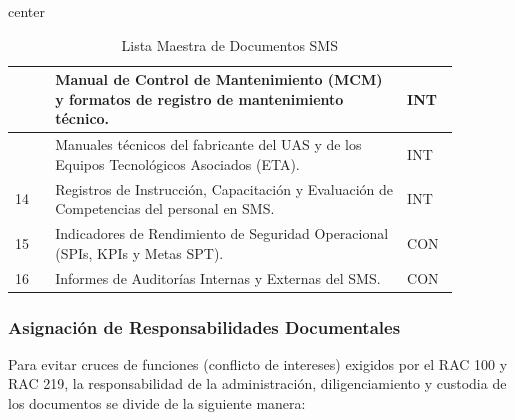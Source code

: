 \begin{table}[H]
\begin{adjustbox}{center}
\begin{tabular}{|>{\centering\arraybackslash}m{0.08\linewidth}|m{0.70\linewidth}|>{\centering\arraybackslash}m{0.1\linewidth}|}
12 & Manual de Control de Mantenimiento (MCM) y formatos de registro de mantenimiento técnico. & INT \\
\hline

13 & Manuales técnicos del fabricante del UAS y de los Equipos Tecnológicos Asociados (ETA). & INT \\
\hline

14 & Registros de Instrucción, Capacitación y Evaluación de Competencias del personal en SMS. & INT \\
\hline

15 & Indicadores de Rendimiento de Seguridad Operacional (SPIs, KPIs y Metas SPT). & CON \\
\hline

16 & Informes de Auditorías Internas y Externas del SMS. & CON \\
\hline

\end{tabular}
\end{adjustbox}
\caption{Lista Maestra de Documentos SMS}
\label{tab:responsabilidades_documentales}
\end{table}

\subsubsection{Asignación de Responsabilidades Documentales}
Para evitar cruces de funciones (conflicto de intereses) exigidos por el RAC 100 y RAC 219, la responsabilidad de la administración, diligenciamiento y custodia de los documentos se divide de la siguiente manera:


